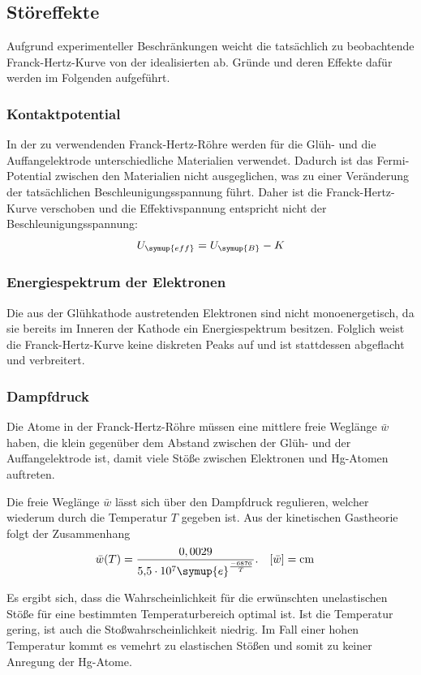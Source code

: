 \subsection{Störeffekte}
\label{sec:Störeffekte}
Aufgrund experimenteller Beschränkungen weicht die tatsächlich zu beobachtende Franck-Hertz-Kurve von der idealisierten ab. 
Gründe und deren Effekte dafür werden im Folgenden aufgeführt.

\subsubsection{Kontaktpotential}
In der zu verwendenden Franck-Hertz-Röhre werden für die Glüh- und die Auffangelektrode unterschiedliche Materialien verwendet. 
Dadurch ist das Fermi-Potential zwischen den Materialien nicht ausgeglichen, was zu einer Veränderung der tatsächlichen 
Beschleunigungsspannung führt. Daher ist die Franck-Hertz-Kurve verschoben und die Effektivspannung entspricht nicht der 
Beschleunigungsspannung:
\begin{equation}
    U_{\symup{eff}} = U_{\symup{B}} - K
    \label{eq:Kontaktpotential}
\end{equation}

\subsubsection{Energiespektrum der Elektronen}
Die aus der Glühkathode austretenden Elektronen sind nicht monoenergetisch, da sie bereits im Inneren der Kathode ein Energiespektrum 
besitzen. Folglich weist die Franck-Hertz-Kurve keine diskreten Peaks auf und ist stattdessen abgeflacht und verbreitert.

\subsubsection{Dampfdruck}
Die Atome in der Franck-Hertz-Röhre müssen eine mittlere freie Weglänge $\bar{w}$ haben, die klein gegenüber dem Abstand zwischen 
der Glüh- und der Auffangelektrode ist, damit viele Stöße zwischen Elektronen und Hg-Atomen auftreten.

Die freie Weglänge $\bar{w}$ lässt sich über den Dampfdruck regulieren, welcher wiederum durch die Temperatur $T$ gegeben 
ist. Aus der kinetischen Gastheorie folgt der Zusammenhang
\begin{align}
    \bar{w}(T) &= \frac{0,0029}{\num{5.5e7} \symup{e}^{\frac{-6876}{T}}}. & [\bar{w}] &= \unit{\centi\metre} \label{eq:freie weglänge} %
\end{align}

Es ergibt sich, dass die Wahrscheinlichkeit für die erwünschten unelastischen Stöße für eine bestimmten Temperaturbereich optimal ist. Ist 
die Temperatur gering, ist auch die Stoßwahrscheinlichkeit niedrig. Im Fall einer hohen Temperatur kommt es vemehrt zu elastischen Stößen 
und somit zu keiner Anregung der Hg-Atome.